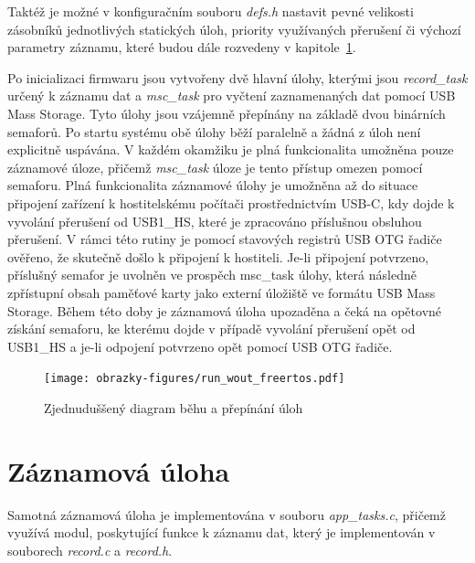 Taktéž je možné v konfiguračním souboru \textit{defs.h} nastavit pevné velikosti zásobníků jednotlivých statických úloh, priority využívaných přerušení či výchozí parametry záznamu, které budou dále rozvedeny v kapitole~\ref{zaznamove_vlakno}. 

Po inicializaci firmwaru jsou vytvořeny dvě hlavní úlohy, kterými jsou \textit{record\_task} určený k záznamu dat a \textit{msc\_task} pro vyčtení zaznamenaných dat pomocí USB Mass Storage. Tyto úlohy jsou vzájemně přepínány na základě dvou binárních semaforů. Po startu systému obě úlohy běží paralelně a žádná z úloh není explicitně uspávána. V každém okamžiku je plná funkcionalita umožněna pouze záznamové úloze, přičemž \textit{msc\_task} úloze je tento přístup omezen pomocí semaforu. Plná funkcionalita záznamové úlohy je umožněna až do situace připojení zařízení k hostitelskému počítači prostřednictvím USB-C, kdy dojde k vyvolání přerušení od USB1\_HS, které je zpracováno příslušnou obsluhou přerušení. V rámci této rutiny je pomocí stavových registrů USB OTG řadiče ověřeno, že skutečně došlo k připojení k hostiteli. Je-li připojení potvrzeno, příslušný semafor je uvolněn ve prospěch msc\_task úlohy, která následně zpřístupní obsah paměťové karty jako externí úložiště ve formátu USB Mass Storage. Během této doby je záznamová úloha upozaděna a čeká na opětovné získání semaforu, ke kterému dojde v případě vyvolání přerušení opět od USB1\_HS a je-li odpojení potvrzeno opět pomocí USB OTG řadiče. 

\begin{figure}[h]
    \centering
    \texttt{[image: obrazky-figures/run\_wout\_freertos.pdf]}
    
    \caption{Zjednuduššený diagram běhu a přepínání úloh}
    \label{fig:run-wout-freertos}
\end{figure}

\newpage

\section{Záznamová úloha}
\label{zaznamove_vlakno}
Samotná záznamová úloha je implementována v souboru \textit{app\_tasks.c}, přičemž využívá modul, poskytující funkce k záznamu dat, který je implementován v souborech \textit{record.c} a \textit{record.h}. 

